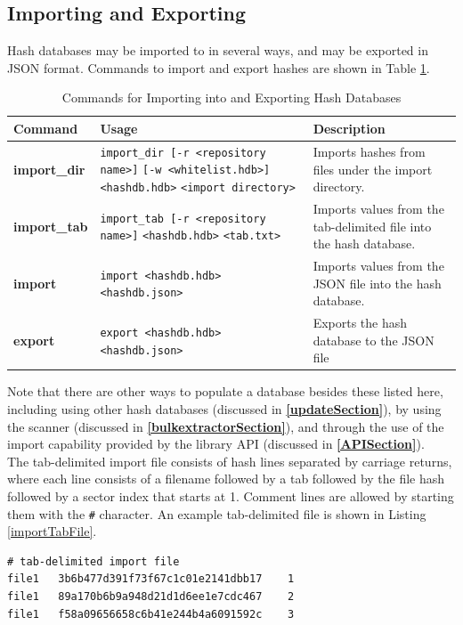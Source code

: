 \documentclass[11pt,fleqn]{article} %
\begin{document}
\subsection{Importing and Exporting}
Hash databases may be imported to in several ways, and may be exported in JSON format.
Commands to import and export hashes are shown in Table \ref{tab:importExport}.\\
\begin{table}[!ht]
\centering
\caption{Commands for Importing into and Exporting Hash Databases}
\label{tab:importExport}
\begin{tabular}{|p{2.5 cm}|p{7 cm}|p{4 cm}|}
\hline \hline
\textbf{Command} & \textbf{Usage} & \textbf{Description} \\
\hline
\textbf{import\_dir} & \verb+import_dir [-r <repository name>]+ \verb+[-w <whitelist.hdb>]+ \verb+<hashdb.hdb>+ \verb+<import directory>+& Imports hashes from files under the import directory.\\
\hline
\textbf{import\_tab} & \verb+import_tab [-r <repository name>]+ \verb+<hashdb.hdb>+ \verb+<tab.txt>+& Imports values from the tab-delimited file into the hash database.\\
\hline
\textbf{import} & \verb+import <hashdb.hdb>+ \verb+<hashdb.json>+& Imports values from the JSON file into the hash database.\\
\hline
\textbf{export} & \verb+export <hashdb.hdb>+ \verb+<hashdb.json>+& Exports the hash database to the JSON file\\
\hline
\end{tabular}
\end{table}
Note that there are other ways to populate a database besides these listed here, including using other hash databases (discussed in \textbf{\autoref{updateSection}}),
by using the \bulk \hdb scanner (discussed in \textbf{\autoref{bulkextractorSection}}),
and through the use of the import capability provided by the \hdb library API (discussed in \textbf{\autoref{APISection}}).\\

The tab-delimited import file consists of hash lines separated by carriage returns, where each line consists of a filename followed by a tab followed by the file hash followed by a sector index that starts at 1.  Comment lines are allowed by starting them with the \texttt{\#} character.
An example tab-delimited file is shown in Listing \ref{importTabFile}.

\lstset{style=customfile}
\begin{lstlisting}[float, caption={Example content of a tab-delimited import file}, label=importTabFile]
# tab-delimited import file
file1	3b6b477d391f73f67c1c01e2141dbb17	1
file1	89a170b6b9a948d21d1d6ee1e7cdc467	2
file1	f58a09656658c6b41e244b4a6091592c	3
\end{lstlisting}
\end{document}
